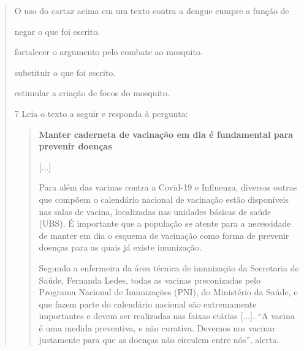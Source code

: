 \begin{quote}
O uso do cartaz acima em um texto contra a dengue cumpre a função de

\begin{escolha}
\item negar o que foi escrito.

\item fortalecer o argumento pelo combate ao mosquito.

\item substituir o que foi escrito.

\item estimular a criação de focos do mosquito.
\end{escolha}


\num{7} Leia o texto a seguir e responda à pergunta:

\begin{quote}
\textbf{Manter caderneta de vacinação em dia é fundamental para prevenir
doenças}

{[}...{]}

Para além das vacinas contra a Covid-19 e Influenza, diversas outras que
compõem o calendário nacional de vacinação estão disponíveis nas salas
de vacina, localizadas nas unidades básicas de saúde (UBS). É importante
que a população se atente para a necessidade de manter em dia o esquema
de vacinação como forma de prevenir doenças para as quais já existe
imunização.

Segundo a enfermeira da área técnica de imunização da Secretaria de
Saúde, Fernanda Ledes, todas as vacinas preconizadas pelo Programa
Nacional de Imunizações (PNI), do Ministério da Saúde, e que fazem parte
do calendário nacional são extremamente importantes e devem ser
realizadas nas faixas etárias {[}...{]}. ``A vacina é uma medida
preventiva, e não curativa. Devemos nos vacinar justamente para que as
doenças não circulem entre nós'', alerta.


\end{quote}
\end{quote}
